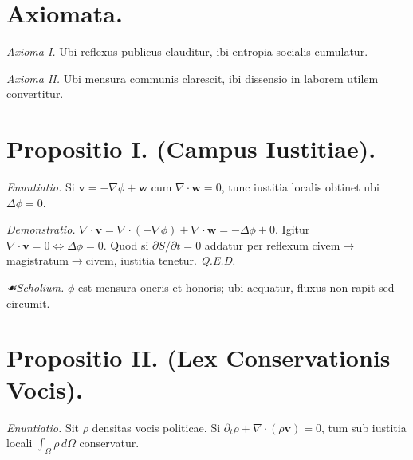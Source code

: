 \documentclass[12pt]{article}
\newcommand{\scholia}{\textit{☙\;}}
\begin{document}
\section*{Axiomata.}

\textit{Axioma I.} \; Ubi reflexus publicus clauditur, ibi entropia socialis cumulatur.

\textit{Axioma II.} \; Ubi mensura communis clarescit, ibi dissensio in laborem utilem convertitur.

\section*{Propositio I. \; (Campus Iustitiae).}

\textit{Enuntiatio.} \; Si \(\mathbf{v}=-\nabla \phi + \mathbf{w}\) cum \(\nabla\cdot \mathbf{w}=0\), tunc iustitia localis obtinet ubi \(\Delta \phi=0\).

\textit{Demonstratio.} \(\nabla\cdot \mathbf{v}=\nabla\cdot(-\nabla \phi)+\nabla\cdot \mathbf{w}=-\Delta \phi + 0\). Igitur \(\nabla\cdot \mathbf{v}=0 \iff \Delta \phi=0\). Quod si \(\partial S/\partial t=0\) addatur per reflexum civem$\to$magistratum$\to$civem, iustitia tenetur. \textit{Q.E.D.}

\textit{\scholia Scholium.} \(\phi\) est mensura oneris et honoris; ubi aequatur, fluxus non rapit sed circumit.

\begin{center}
\end{center}

\section*{Propositio II. \; (Lex Conservationis Vocis).}

\textit{Enuntiatio.} \; Sit \(\rho\) densitas vocis politicae. Si \(\partial_t \rho + \nabla\cdot(\rho \mathbf{v})=0\), tum sub iustitia locali \(\int_{\Omega}\rho \, d\Omega\) conservatur.
\end{document}
